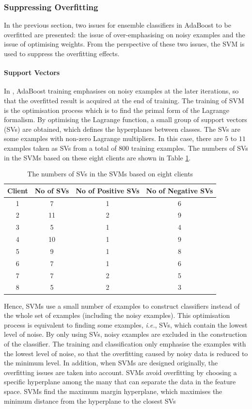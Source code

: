 \subsubsection{Suppressing Overfitting}
\label{sec:suppressingoverfitinSVM}
In the previous section, two issues for ensemble classifiers in AdaBoost to be overfitted are presented: the issue of over-emphasising on noisy examples and the issue of optimising weights. From the perspective of these two issues, the SVM is used to suppress the overfitting effects.
\paragraph{Support Vectors}
In \cite{Freund1996}, AdaBoost training emphasises on noisy examples at the later iterations, so that the overfitted result is acquired at the end of training. The training of SVM is the optimisation process which is to find the primal form of the Lagrange formalism. By optimising the Lagrange function, a small group of support vectors (SVs) are obtained, which defines the hyperplanes between classes. The SVs are some examples with non-zero Lagrange multipliers. In this case, there are $5$ to $11$ examples taken as SVs from a total of $800$ training examples. The numbers of SVs in the SVMs based on these eight clients are shown in \mbox{Table} \ref{tab:noSVs}. 
\begin{table}[ht]
\begin{center}
\caption{The numbers of SVs in the SVMs based on eight clients}
 \begin{tabular}{|c|c|c|c|}
  \hline
  Client & No of SVs & No of Positive SVs & No of Negative SVs \\
  \hline
  1 & 7 & 1 & 6 \\
  2 & 11 & 2 & 9 \\
  3 & 5 & 1 & 4 \\
  4 & 10 & 1 & 9 \\
  5 & 9 & 1 & 8 \\
  6 & 7 & 1 & 6 \\
  7 & 7 & 2 & 5 \\
  8 & 5 & 2 & 3 \\
  \hline
 \end{tabular}
\label{tab:noSVs} 
\end{center}
\end{table}
Hence, SVMs use a small number of examples to construct classifiers instead of the whole set of examples (including the noisy examples). This optimisation process is equivalent to finding some examples, \textit{i.e.}, SVs, which contain the lowest level of noise. By only using SVs, noisy examples are excluded in the construction of the classifier. The training and classification only emphasise the examples with the lowest level of noise, so that the overfitting caused by noisy data is reduced to the minimum level. In addition, when SVMs are designed originally, the overfitting issues are taken into account. SVMs avoid overfitting by choosing a specific hyperplane among the many that can separate the data in the feature space. SVMs find the maximum margin hyperplane, which maximises the minimum distance from the hyperplane to the closest SVs 

